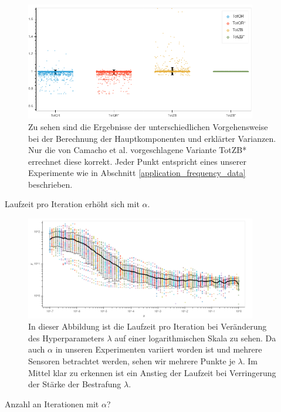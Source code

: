 \begin{figure}
\centering
\includegraphics[width = 0.9\textwidth]{figures/total_variance_validation.png}
\caption{Zu sehen sind die Ergebnisse der unterschiedlichen Vorgehensweise bei der Berechnung der Hauptkomponenten und erklärter Varianzen. Nur die von Camacho et al. vorgeschlagene Variante TotZB* errechnet diese korrekt. Jeder Punkt entspricht eines unserer Experimente wie in Abschnitt \ref{application_frequency_data} beschrieben.}
\label{total_variance_validation}
\end{figure}

Laufzeit pro Iteration erhöht sich mit $\alpha$.
\begin{figure}
\centering
\includegraphics[width = 0.9\textwidth]{figures/run_time_per_iteration.png}
\caption{In dieser Abbildung ist die Laufzeit pro Iteration bei Veränderung des Hyperparameters $\lambda$ auf einer logarithmischen Skala zu sehen. Da auch $\alpha$ in unseren Experimenten variiert worden ist und mehrere Sensoren betrachtet werden, sehen wir mehrere Punkte je $\lambda$. Im Mittel klar zu erkennen ist ein Anstieg der Laufzeit bei Verringerung der Stärke der Bestrafung $\lambda$.}
\label{run_time_per_iteration}
\end{figure}

Anzahl an Iterationen mit $\alpha$?